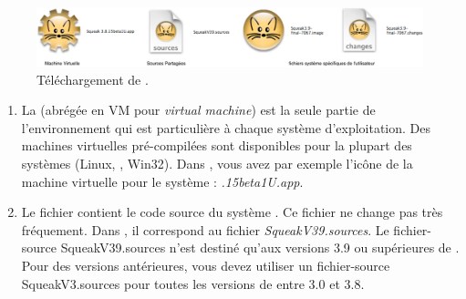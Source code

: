 \documentclass[a4paper,10pt,twoside]{book}
\begin{document}
\begin{figure}[htb]
\centerline {\includegraphics[width=\textwidth]{annotatedDownload}}
\caption{Téléchargement de \sq. \label{fig:download}}
\end{figure}

\begin{enumerate}


\item La  (abr\'eg\'ee en VM pour
  \emph{virtual machine}) est la seule partie de l'environnement qui
  est particulière à chaque système d'exploitation. Des machines
  virtuelles pré-compilées sont disponibles pour la plupart des
  systèmes (Linux, \macosx, Win32). Dans , vous
  avez par exemple l'ic\^one de la machine virtuelle pour le syst\`eme \macosx: \textit{.15beta1U.app}.


  \item Le fichier  contient le code source du système
    \sq. Ce fichier ne change pas tr\`es fréquement. Dans , il
    correspond au fichier \emph{SqueakV39.sources}. Le fichier-source SqueakV39.sources n'est destiné qu'aux versions 3.9 ou supérieures de \sq. Pour des versions antérieures, vous devez utiliser un fichier-source SqueakV3.sources pour toutes les versions de \sq entre 3.0 et 3.8.


\end{enumerate}
\end{document}
